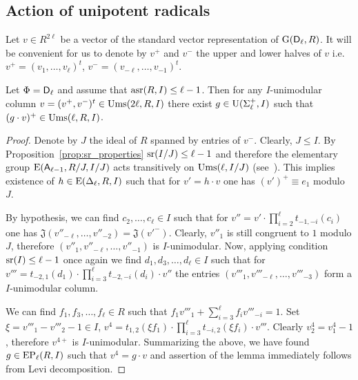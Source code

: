 \subsection{Action of unipotent radicals}
Let $v\in R^{2\ell}$ be a vector of the standard vector representation of $\operatorname{G}(\mathsf{D}_\ell, R)$.
It will be convenient for us to denote by $v^+$ and $v^-$ the upper and lower halves of $v$ i.e. $v^+=(v_1,\ldots, v_\ell)^t$, $v^-=(v_{-\ell},\ldots, v_{-1})^t$.
\begin{lemma}\label{lemma:asrUnip}
 Let $\Phi=\mathsf{D}_\ell$ and assume that $\operatorname{asr}(R, I)\leq \ell -1$. Then for any $I$-unimodular column $v=(v^+, v^-)^t\in\operatorname{Ums}(2\ell, R, I)$
 there exist $g\in\operatorname{U}(\Sigma^+_\ell, I)$ such that $(g \cdot v)^+ \in \operatorname{Ums}(\ell, R, I)$.
\end{lemma}
\begin{proof} Denote by $J$ the ideal of $R$ spanned by entries of $v^-$. Clearly, $J \leq I$.
By Proposition~\ref{prop:sr_properties} $\operatorname{sr}(I/J) \leq \ell-1$ and therefore
the elementary group $\operatorname{E}(\mathsf{A}_{\ell-1}, R/J, I/J)$ acts transitively on $\operatorname{Ums}(\ell, I/J)$ (see~\cite[Theorem~2.3c]{Va69}). 
This implies existence of $h\in \operatorname{E}(\Delta_\ell, R, I)$ such that for $v' = h \cdot v$ one has $(v')^+ \equiv e_1$ modulo $J$.

By hypothesis, we can find $c_2,\ldots, c_\ell\in I$ such that for $v''=v'\cdot \prod\limits_{i=2}^{\ell}t_{-1, -i}(c_i)$ one has
$\mathfrak{J}(v''_{-\ell},\ldots, v''_{-2}) = \mathfrak{J}(v'^-)$. Clearly, $v''_1$ is still congruent to $1$ modulo $J$, therefore 
$(v''_1, v''_{-\ell},\ldots, v''_{-1})$ is $I$-unimodular. Now, applying condition $\operatorname{sr}(I) \leq \ell-1$ once again we find
$d_1,d_3,\ldots, d_{\ell}\in I$ such that for $v'''=t_{-2,1}(d_1) \cdot \prod\limits_{i=3}^{\ell} t_{-2,-i}(d_i) \cdot v''$
the entries $(v'''_1, v'''_{-\ell},\ldots, v'''_{-3})$ form a $I$-unimodular column.

We can find $f_1, f_3,\ldots, f_\ell \in R$ such that $f_1v'''_1+\sum\limits_{i=3}^\ell f_i v'''_{-i} = 1$.
Set $\xi = v'''_1-v'''_2-1 \in I$, $v^4=t_{1,2}(\xi f_1) \cdot \prod\limits_{i=3}^\ell t_{-i,2}(\xi f_i) \cdot v'''$.
Clearly $v^4_2 = v^4_1-1$, therefore $v^{4+}$ is $I$-unimodular.
Summarizing the above, we have found $g\in \operatorname{EP}_\ell(R, I)$ such that $v^4=g \cdot v$
and assertion of the lemma immediately follows from Levi decomposition. \end{proof}

